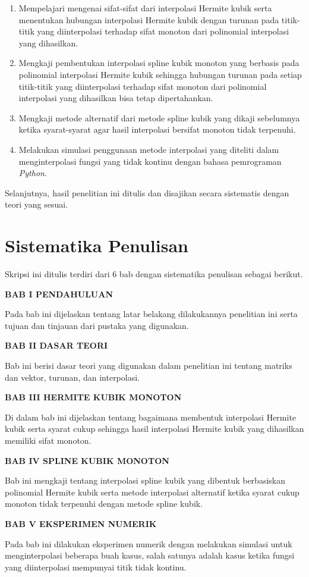 \begin{enumerate}
    \item Mempelajari mengenai sifat-sifat dari interpolasi Hermite kubik serta menentukan hubungan interpolasi Hermite kubik dengan turunan pada titik-titik yang diinterpolasi terhadap sifat monoton dari polinomial interpolasi yang dihasilkan.
    \item Mengkaji pembentukan interpolasi spline kubik monoton yang berbasis pada polinomial interpolasi Hermite kubik sehingga hubungan turunan pada setiap titik-titik yang diinterpolasi terhadap sifat monoton dari polinomial interpolasi yang dihasilkan bisa tetap dipertahankan.
    \item Mengkaji metode alternatif dari metode spline kubik yang dikaji sebelumnya ketika syarat-syarat agar hasil interpolasi bersifat monoton tidak terpenuhi.
    \item Melakukan simulasi penggunaan metode interpolasi yang diteliti dalam menginterpolasi fungsi yang tidak kontinu dengan bahasa pemrograman \textit{Python}.
\end{enumerate}

Selanjutnya, hasil penelitian ini ditulis dan disajikan secara sistematis dengan teori yang sesuai.

\section{Sistematika Penulisan}

Skripsi ini ditulis terdiri dari 6 bab dengan sistematika penulisan sebagai berikut.

\noindent\textbf{BAB I PENDAHULUAN}

Pada bab ini dijelaskan tentang latar belakang dilakukannya penelitian ini serta tujuan dan tinjauan dari pustaka yang digunakan.

\noindent\textbf{BAB II DASAR TEORI}

Bab ini berisi dasar teori yang digunakan dalam penelitian ini tentang matriks dan vektor, turunan, dan interpolasi.

\noindent\textbf{BAB III HERMITE KUBIK MONOTON}

Di dalam bab ini dijelaskan tentang bagaimana membentuk interpolasi Hermite kubik serta syarat cukup sehingga hasil interpolasi Hermite kubik yang dihasilkan memiliki sifat monoton.

\noindent\textbf{BAB IV SPLINE KUBIK MONOTON}

Bab ini mengkaji tentang interpolasi spline kubik yang dibentuk berbasiskan polinomial Hermite kubik serta metode interpolasi alternatif ketika syarat cukup monoton tidak terpenuhi dengan metode spline kubik.

\noindent\textbf{BAB V EKSPERIMEN NUMERIK}

Pada bab ini dilakukan eksperimen numerik dengan melakukan simulasi untuk menginterpolasi beberapa buah kasus, salah satunya adalah kasus ketika fungsi yang diinterpolasi mempunyai titik tidak kontinu.